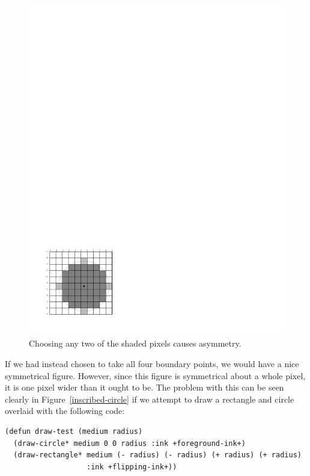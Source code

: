 \begin{figure}
\centerline{\includegraphics{corner-circle}}
\caption{\label{corner-circle} Choosing any two of the shaded pixels causes asymmetry.}
\end{figure}

If we had instead chosen to take all four boundary points, we would have a nice
symmetrical figure.  However, since this figure is symmetrical about a whole
pixel, it is one pixel wider than it ought to be.  The problem with this can be
seen clearly in Figure~\ref{inscribed-circle} if we attempt to draw a rectangle
and circle overlaid with the following code:

\begin{verbatim}
(defun draw-test (medium radius)
  (draw-circle* medium 0 0 radius :ink +foreground-ink+)
  (draw-rectangle* medium (- radius) (- radius) (+ radius) (+ radius)
                   :ink +flipping-ink+))
\end{verbatim}

